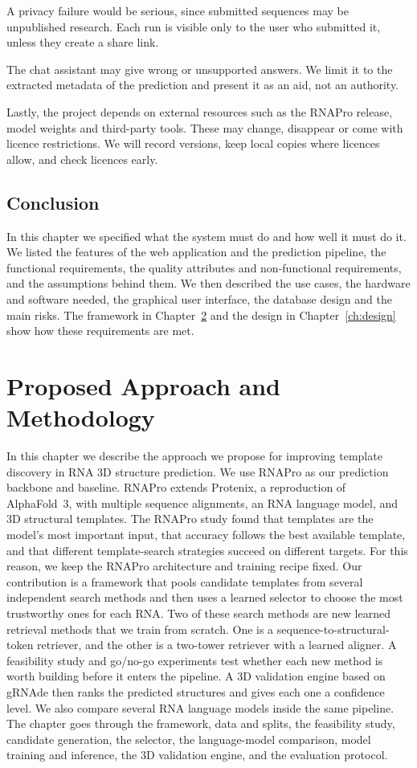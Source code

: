 \documentclass{FastFyp}
\begin{document}
A privacy failure would be serious, since submitted sequences may be unpublished research. Each run is visible only to the user who submitted it, unless they create a share link.

The chat assistant may give wrong or unsupported answers. We limit it to the extracted metadata of the prediction and present it as an aid, not an authority.

Lastly, the project depends on external resources such as the RNAPro release, model weights and third-party tools. These may change, disappear or come with licence restrictions. We will record versions, keep local copies where licences allow, and check licences early.

\section{Conclusion}
In this chapter we specified what the system must do and how well it must do it. We listed the features of the web application and the prediction pipeline, the functional requirements, the quality attributes and non-functional requirements, and the assumptions behind them. We then described the use cases, the hardware and software needed, the graphical user interface, the database design and the main risks. The framework in Chapter~\ref{ch:approach} and the design in Chapter~\ref{ch:design} show how these requirements are met.

\clearpage


\chapter{Proposed Approach and Methodology}
\label{ch:approach}

In this chapter we describe the approach we propose for improving template discovery in RNA 3D structure prediction. We use RNAPro \cite{leerna} as our prediction backbone and baseline. RNAPro extends Protenix, a reproduction of AlphaFold~3, with multiple sequence alignments, an RNA language model, and 3D structural templates. The RNAPro study found that templates are the model's most important input, that accuracy follows the best available template, and that different template-search strategies succeed on different targets. For this reason, we keep the RNAPro architecture and training recipe fixed. Our contribution is a framework that pools candidate templates from several independent search methods and then uses a learned selector to choose the most trustworthy ones for each RNA. Two of these search methods are new learned retrieval methods that we train from scratch. One is a sequence-to-structural-token retriever, and the other is a two-tower retriever with a learned aligner. A feasibility study and go/no-go experiments test whether each new method is worth building before it enters the pipeline. A 3D validation engine based on gRNAde then ranks the predicted structures and gives each one a confidence level. We also compare several RNA language models inside the same pipeline. The chapter goes through the framework, data and splits, the feasibility study, candidate generation, the selector, the language-model comparison, model training and inference, the 3D validation engine, and the evaluation protocol.
\end{document}

